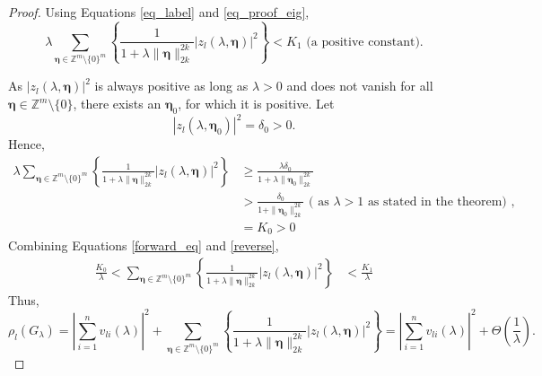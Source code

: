 \documentclass[10pt,a4paper]{amsart}
\begin{document}
\begin{proof}
Using Equations \ref{eq_label} and \ref{eq_proof_eig},
\begin{equation}\label{forward_eq}
\lambda\sum_{\boldsymbol{\eta}\in\mathbb{Z}^m\setminus\{0\}^m}\left\{ \frac{1}{1+\lambda\|\boldsymbol{\eta}\|_{2k}^{2k}}\left|z_l(\lambda,\boldsymbol{\eta})\right|^2 \right\} < K_1 \mbox{   (a positive constant)}.
\end{equation}

As $\left|z_l(\lambda,\boldsymbol{\eta})\right|^2$ is always positive as long as $\lambda>0$ and does not vanish for all $\boldsymbol{\eta}\in\mathbb{Z}^m\setminus\{0\}$, there exists an $\boldsymbol{\eta}_0$, for which it is positive. Let \begin{equation}\label{delta}
\left|z_l(\lambda,\boldsymbol{\eta}_0)\right|^2 = \delta_0 > 0.
\end{equation}
Hence, \begin{equation}\label{reverse}
\begin{aligned}
\lambda\sum_{\boldsymbol{\eta}\in\mathbb{Z}^m\setminus\{0\}^m}\left\{ \frac{1}{1+\lambda\|\boldsymbol{\eta}\|_{2k}^{2k}}\left|z_l(\lambda,\boldsymbol{\eta})\right|^2 \right\} &\ge  \frac{\lambda\delta_0}{1+\lambda\|\boldsymbol{\eta}_0\|_{2k}^{2k}}\\
&> \frac{\delta_0}{1+\|\boldsymbol{\eta}_0\|_{2k}^{2k}}\mbox{               ( as  }\lambda >1 \mbox{ as stated in the theorem)       }, \\
&= K_0 > 0
\end{aligned}
\end{equation}
Combining Equations \ref{forward_eq} and \ref{reverse},
\begin{equation}
\label{pp}
\begin{aligned}
\frac{K_0}{\lambda} < \sum_{\boldsymbol{\eta}\in\mathbb{Z}^m\setminus\{0\}^m}\left\{ \frac{1}{1+\lambda\|\boldsymbol{\eta}\|_{2k}^{2k}}\left|z_l(\lambda,\boldsymbol{\eta})\right|^2 \right\} &< \frac{K_1}{\lambda} 
\end{aligned}
\end{equation}
Thus, $$\rho_l(G_{\lambda}) = \left|\sum\limits_{i=1}^nv_{li}(\lambda)\right|^2 +\sum_{\boldsymbol{\eta}\in\mathbb{Z}^m\setminus\{0\}^m}\left\{ \frac{1}{1+\lambda\|\boldsymbol{\eta}\|_{2k}^{2k}}\left|z_l(\lambda,\boldsymbol{\eta})\right|^2 \right\} = \left|\sum\limits_{i=1}^nv_{li}(\lambda)\right|^2 +\Theta(\frac{1}{\lambda}).$$ 


\end{proof}
\end{document}
